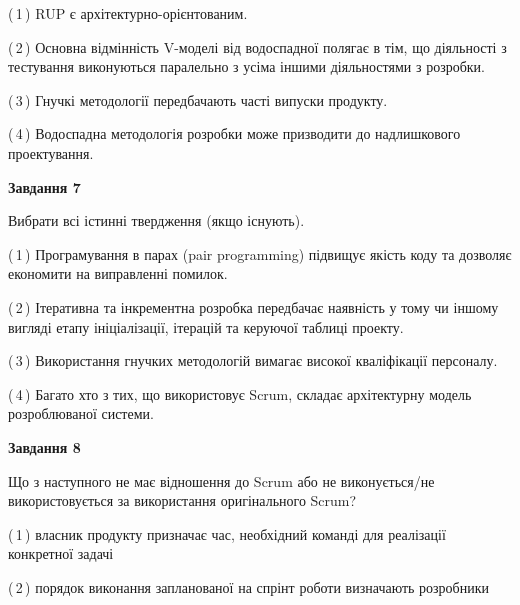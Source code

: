 \documentclass[10pt, ukrainian]{article}
\begin{document}
{\begin {large}
(\,1\,) RUP є архітектурно-орієнтованим. %



(\,2\,) Основна відмінність V-моделі від водоспадної полягає в тім, що діяльності з тестування виконуються паралельно з усіма іншими діяльностями з розробки. %



(\,3\,) Гнучкі методології передбачають часті випуски продукту. %



(\,4\,) Водоспадна методологія розробки може призводити до надлишкового проектування. %


{\begin {center}\textbf{Завдання 7}\end {center}}\par
Вибрати всі істинні твердження (якщо існують).\par
\vspace{2mm}



(\,1\,) Програмування в парах (pair programming) підвищує якість коду та дозволяє економити на виправленні помилок. %



(\,2\,) Ітеративна та інкрементна розробка передбачає наявність у тому чи іншому вигляді етапу ініціалізації, ітерацій та керуючої таблиці проекту. %



(\,3\,) Використання гнучких методологій вимагає високої кваліфікації персоналу. %



(\,4\,) Багато хто з тих, що використовує Scrum, складає архітектурну модель розроблюваної системи. %


{\begin {center}\textbf{Завдання 8}\end {center}}\par
Що з наступного не має відношення до Scrum або не виконується/не використовується за використання оригінального Scrum?\par
\vspace{2mm}



(\,1\,) власник продукту призначає час, необхідний команді для реалізації конкретної задачі%



(\,2\,) порядок виконання запланованої на спрінт роботи визначають розробники%




\end{large}}
\end{document}
